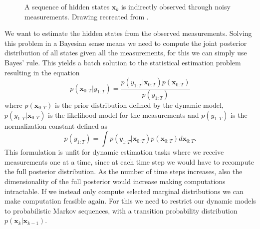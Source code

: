 \begin{figure}[ht!]
    \centering
 \caption{A sequence of  hidden states $\mathbf{x}_k$ is indirectly
 observed through noisy measurements. Drawing recreated from \citep{sarkka2013bayesian}.}
    \label{fig:inversion}
\end{figure}


We want to estimate the hidden states from the observed
measurements. Solving this problem in a Bayesian
sense means we 
need to compute the joint posterior distribution of all
states given all the measurements, for this we can simply
use Bayes' rule.
This yields a batch solution to the statistical estimation problem
resulting in the equation
\begin{equation}
  \label{eq:bayes}
  p(\mathbf{x}_{0:T} | y_{1:T})
  = \frac{p(y_{1:T} | \mathbf{x}_{0:T}) p(\mathbf{x}_{0:T})}
  {p(y_{1:T})}
\end{equation}
where $p(\mathbf{x}_{0:T})$ is the prior distribution defined by the dynamic
model, $p(y_{1:T} | \mathbf{x}_{0:T})$ is the likelihood model for the
measurements and $p(y_{1:T})$ is the normalization constant defined as
$$ p(y_{1:T}) = \int p(y_{1:T} | \mathbf{x}_{0:T})
p(\mathbf{x}_{0:T}) d \mathbf{x}_{0:T}.$$
This formulation is unfit for dynamic estimation tasks where
we receive measurements one at a time, since
at each time step we would have to
recompute the full posterior distribution. As the number of
time steps increases, also the dimensionality of the full posterior
would increase making computations intractable.
If we instead only compute selected marginal distributions we can
make computation feasible again. For this we need to restrict
our dynamic models to probabilistic Markov sequences, with a
transition probability distribution $p(\mathbf{x}_k | \mathbf{x}_{k-1})$.


